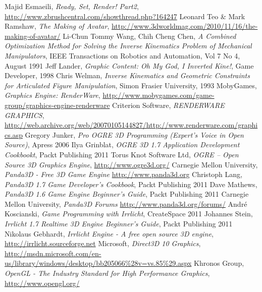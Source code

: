 \documentclass[11pt]{mwrep}
\begin{document}
\begin{thebibliography}{99}


 Majid Esmaeili, \textit{Ready, Set, Render! Part2}, \url{http://www.zbrushcentral.com/showthread.php?164247}
 Leonard Teo \& Mark Ramshaw, \textit{The Making of Avatar}, \url{http://www.3dworldmag.com/2010/11/16/the-making-of-avatar/}
 Li-Chun Tommy Wang, Chih Cheng Chen, \textit{A Combined Optimization Method for Solving the Inverse Kinematics Problem of Mechanical Manipulators}, IEEE Transactions on Robotics and Automation, Vol 7 No 4, August 1991
 Jeff Lander, \textit{Graphic Content: Oh My God, I Inverted Kine!}, Game Developer, 1998
 Chris Welman, \textit{Inverse Kinematics and Geometric Constraints for Articulated Figure Manipulation}, Simon Frasier University, 1993
 MobyGames, \textit{Graphics Engine: RenderWare}, \url{http://www.mobygames.com/game-group/graphics-engine-renderware}
 Criterion Software, \textit{RENDERWARE GRAPHICS}, \url{http://web.archive.org/web/20070105144827/http://www.renderware.com/graphics.asp}
 Gregory Junker, \textit{Pro OGRE 3D Programming (Expert's Voice in Open Source)}, Apress 2006
 Ilya Grinblat, \textit{OGRE 3D 1.7 Application Development Cookbookt}, Packt Publishing 2011
 Torus Knot Software Ltd, \textit{OGRE -- Open Source 3D Graphics Engine}, \url{http://www.ogre3d.org/}
 Carnegie Mellon University, \textit{Panda3D - Free 3D Game Engine} \url{http://www.panda3d.org}
 Christoph Lang, \textit{Panda3D 1.7 Game Developer's Cookbook}, Packt Publishing 2011
 Dave Mathews, \textit{Panda3D 1.6 Game Engine Beginner's Guide}, Packt Publishing 2011
 Carnegie Mellon University, \textit{Panda3D Forums} \url{http://www.panda3d.org/forums/}
 André Koscianski, \textit{Game Programming with Irrlicht}, CreateSpace 2011
 Johannes Stein, \textit{Irrlicht 1.7 Realtime 3D Engine Beginner's Guide}, Packt Publishing 2011
\pagebreak
{} Nikolaus Gebhardt, \textit{Irrlicht Engine - A free open source 3D engine}, \url{http://irrlicht.sourceforge.net}
 Microsoft, \textit{Direct3D 10 Graphics}, \url{http://msdn.microsoft.com/en-us/library/windows/desktop/bb205066%28v=vs.85%29.aspx}
 Khronos Group, \textit{OpenGL - The Industry Standard for High Performance Graphics}, \url{http://www.opengl.org/}

\end{thebibliography}
\end{document}
